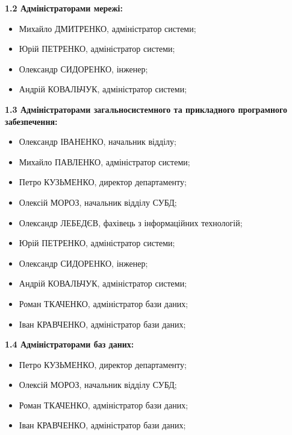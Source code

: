 \documentclass[12pt]{article}
\begin{document}
  \textbf{1.2 Адміністраторами мережі:}
  \begin{itemize}
    
      \item Михайло ДМИТРЕНКО, адміністратор системи;
    
      \item Юрій ПЕТРЕНКО, адміністратор системи;
    
      \item Олександр СИДОРЕНКО, інженер;
    
      \item Андрій КОВАЛЬЧУК, адміністратор системи;
    
  \end{itemize}

  \textbf{1.3 Адміністраторами загальносистемного та прикладного програмного забезпечення:}
  \begin{itemize}
    
      \item Олександр ІВАНЕНКО, начальник відділу;
    
      \item Михайло ПАВЛЕНКО, адміністратор системи;
    
      \item Петро КУЗЬМЕНКО, директор департаменту;
    
      \item Олексій МОРОЗ, начальник відділу СУБД;
    
      \item Олександр ЛЕБЕДЄВ, фахівець з інформаційних технологій;
    
      \item Юрій ПЕТРЕНКО, адміністратор системи;
    
      \item Олександр СИДОРЕНКО, інженер;
    
      \item Андрій КОВАЛЬЧУК, адміністратор системи;
    
      \item Роман ТКАЧЕНКО, адміністратор бази даних;
    
      \item Іван КРАВЧЕНКО, адміністратор бази даних;
    
  \end{itemize}

  \textbf{1.4 Адміністраторами баз даних:}
  \begin{itemize}
    
      \item Петро КУЗЬМЕНКО, директор департаменту;
    
      \item Олексій МОРОЗ, начальник відділу СУБД;
    
      \item Роман ТКАЧЕНКО, адміністратор бази даних;
    
      \item Іван КРАВЧЕНКО, адміністратор бази даних;
    
  \end{itemize}
\end{document}

